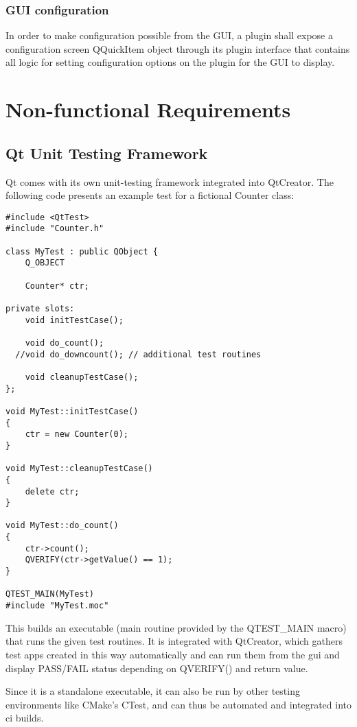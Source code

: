 \subsubsection{GUI configuration}
In order to make configuration possible from the GUI, a plugin shall expose a configuration screen QQuickItem object through its plugin interface that contains all logic for setting configuration options on the plugin for the GUI to display.

\section{Non-functional Requirements}

\subsection{Qt Unit Testing Framework}
Qt comes with its own unit-testing framework integrated into QtCreator. The following code presents an example test for a fictional Counter class:

\begin{lstlisting}
#include <QtTest>
#include "Counter.h"

class MyTest : public QObject {
    Q_OBJECT

    Counter* ctr;

private slots:
    void initTestCase();

    void do_count();
  //void do_downcount(); // additional test routines

    void cleanupTestCase();
};

void MyTest::initTestCase()
{
	ctr = new Counter(0);
}

void MyTest::cleanupTestCase()
{
    delete ctr;
}

void MyTest::do_count()
{
	ctr->count();
	QVERIFY(ctr->getValue() == 1);
}

QTEST_MAIN(MyTest)
#include "MyTest.moc"
\end{lstlisting}

This builds an executable (main routine provided by the QTEST\_MAIN macro) that runs the given test routines.
It is integrated with QtCreator, which gathers test apps created in this way automatically and can run them from the \gls{gui} and display PASS/FAIL status depending on QVERIFY() and return value.
\begin{figure}[h]
\end{figure}

Since it is a standalone executable, it can also be run by other testing environments like CMake's CTest, and can thus be automated and integrated into \gls{ci} builds.

